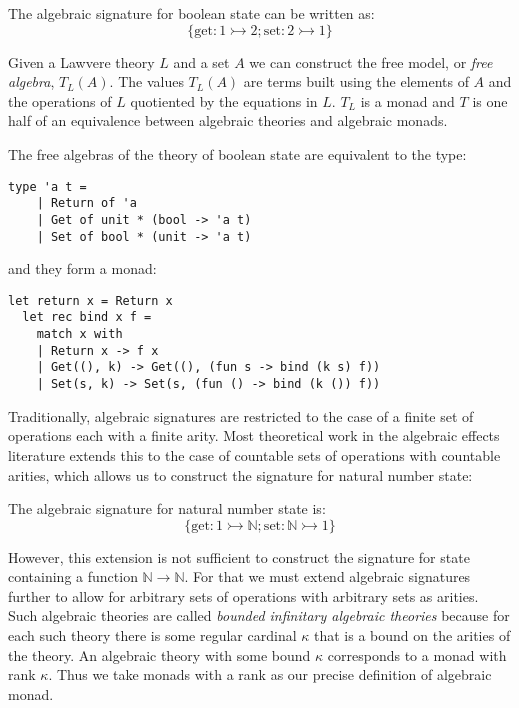 \documentclass[acmsmall, screen, nonacm]{acmart}
\theoremstyle{definition}
\newcommand{\nat}{\mathbb{N}}
\newcommand{\types}{\mathrel{:}}
\begin{document}
\begin{example}
  The algebraic signature for boolean state can be written as:
  \begin{equation*}
    \{ \mathrm{get} \types 1 \rightarrowtail 2; \mathrm{set} \types 2 \rightarrowtail 1 \}
  \end{equation*}
\end{example}

Given a Lawvere theory $L$ and a set $A$ we can construct the free
model, or \emph{free algebra}, $T_L(A)$. The values $T_L(A)$ are terms
built using the elements of $A$ and the operations of $L$ quotiented by
the equations in $L$. $T_L$ is a monad and $T$ is one half of an
equivalence between algebraic theories and algebraic monads.

\begin{example}
  The free algebras of the theory of boolean state are equivalent
  to the type:
  \begin{lstlisting}[style=oxcaml]
  type 'a t =
    | Return of 'a
    | Get of unit * (bool -> 'a t)
    | Set of bool * (unit -> 'a t)
  \end{lstlisting}
  and they form a monad:
  \begin{lstlisting}[style=oxcaml]
  let return x = Return x
  let rec bind x f =
    match x with
    | Return x -> f x
    | Get((), k) -> Get((), (fun s -> bind (k s) f))
    | Set(s, k) -> Set(s, (fun () -> bind (k ()) f))
  \end{lstlisting}  
\end{example}

Traditionally, algebraic signatures are restricted to the case of a
finite set of operations each with a finite arity. Most theoretical work
in the algebraic effects literature extends this to the case of
countable sets of operations with countable arities, which allows us to
construct the signature for natural number state:

\begin{example}
  The algebraic signature for natural number state is:
  \begin{equation*}
    \{ \mathrm{get} \types 1 \rightarrowtail \nat;
       \mathrm{set} \types \nat \rightarrowtail 1 \}
  \end{equation*}
\end{example}

However, this extension is not sufficient to construct the signature for
state containing a function $\nat \rightarrow \nat$. For that we must
extend algebraic signatures further to allow for arbitrary sets of
operations with arbitrary sets as arities. Such algebraic theories are
called \emph{bounded infinitary algebraic theories} because for each
such theory there is some regular cardinal $\kappa$ that is a bound on
the arities of the theory. An algebraic theory with some bound $\kappa$
corresponds to a monad with rank $\kappa$. Thus we take monads with a
rank as our precise definition of algebraic monad.
\end{document}
